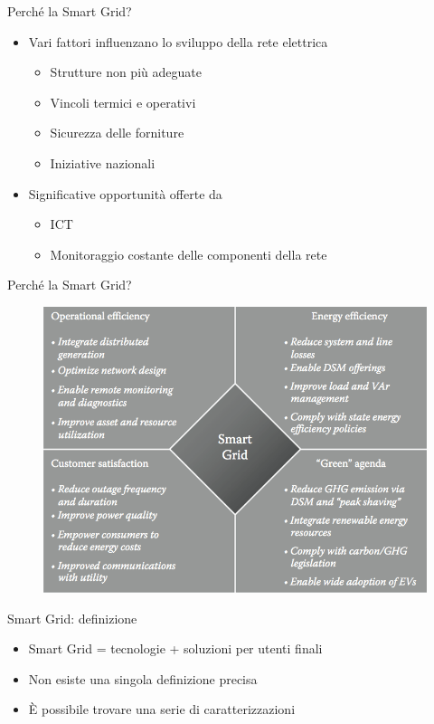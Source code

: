 \begin{frame}{Perché la Smart Grid?}
	\begin{itemize}[<+- | alert@+>]
	\item Vari fattori influenzano lo sviluppo della rete elettrica
	 \begin{itemize}
	  	\item Strutture non più adeguate
	  	\item Vincoli termici e operativi
	  	\item Sicurezza delle forniture
	  	\item Iniziative nazionali
	 \end{itemize}
	\item Significative opportunità offerte da 
	\begin{itemize}
	\item ICT
	\item Monitoraggio costante delle componenti della rete
	\end{itemize}
	\end{itemize}
\end{frame}


\begin{frame}{Perché la Smart Grid?}
	\begin{figure}[h] 
		\includegraphics[scale=0.3, cfbox=blue_slides 1pt 0pt]{imgs/benefits.png}
	\end{figure}
\end{frame}


\begin{frame}{Smart Grid: definizione}
\begin{itemize}[<+- | alert@+>]
\item Smart Grid = tecnologie + soluzioni per utenti finali
\item Non esiste una singola definizione precisa
\item È possibile trovare una serie di caratterizzazioni
\end{itemize}
\end{frame}

